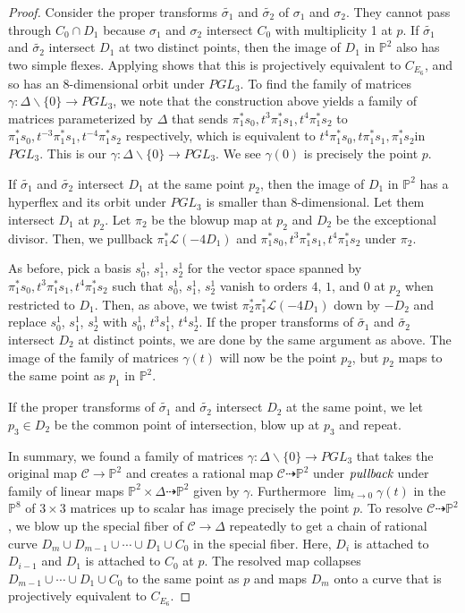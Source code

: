 \documentclass{article}
\theoremstyle{definition}
\newcommand{\mb}{\mathbb}
\newcommand{\mc}{\mathcal}
\newcommand{\wt}{\widetilde}
\begin{document}
\begin{proof}
Consider the proper transforms $\wt{\sigma_1}$ and $\wt{\sigma_2}$ of $\sigma_1$ and $\sigma_2$. They cannot pass through $C_0\cap D_1$ because $\sigma_1$ and $\sigma_2$ intersect $C_0$ with multiplicity 1 at $p$. If $\wt{\sigma_1}$ and $\wt{\sigma_2}$ intersect $D_1$ at two distinct points, then the image of $D_1$ in $\mb{P}^2$ also has two simple flexes. Applying  shows that this is projectively equivalent to $C_{E_6}$, and so has an 8-dimensional orbit under $PGL_3$. To find the family of matrices $\gamma: \Delta\backslash\{0\}\to PGL_3$, we note that the construction above yields a family of matrices parameterized by $\Delta$ that sends $\pi_1^{*}s_0, t^3\pi_1^{*}s_1, t^4\pi_1^{*}s_2$ to $\pi_1^{*}s_0, t^{-3}\pi_1^{*}s_1, t^{-4}\pi_1^{*}s_2$ respectively, which is equivalent to $t^4\pi_1^{*}s_0, t\pi_1^{*}s_1, \pi_1^{*}s_2$in $PGL_3$. This is our $\gamma: \Delta\backslash\{0\}\to PGL_3$. We see $\gamma(0)$ is precisely the point $p$. 

If $\wt{\sigma_1}$ and $\wt{\sigma_2}$ intersect $D_1$ at the same point $p_2$, then the image of $D_1$ in $\mb{P}^2$ has a hyperflex and its orbit under $PGL_3$ is smaller than 8-dimensional. Let them intersect $D_1$ at $p_2$. Let $\pi_2$ be the blowup map at $p_2$ and $D_2$ be the exceptional divisor. Then, we pullback $\pi_1^{*}\mc{L}(-4D_1)$ and $\pi_1^{*}s_0, t^3\pi_1^{*}s_1, t^4\pi_1^{*}s_2$ under $\pi_2$. 

As before, pick a basis $s_0^1$, $s_1^1$, $s_2^1$ for the vector space spanned by $\pi_1^{*}s_0, t^3\pi_1^{*}s_1, t^4\pi_1^{*}s_2$ such that $s_0^1$, $s_1^1$, $s_2^1$ vanish to orders $4$, $1$, and $0$ at $p_2$ when restricted to $D_1$. Then, as above, we twist $\pi_2^{*}\pi_1^{*}\mc{L}(-4D_1)$ down by $-D_2$ and replace $s_0^1$, $s_1^1$, $s_2^1$ with $s_0^1$, $t^3s_1^1$, $t^4s_2^1$. If the proper transforms of $\wt{\sigma_1}$ and $\wt{\sigma_2}$ intersect $D_2$ at distinct points, we are done by the same argument as above. The image of the family of matrices $\gamma(t)$ will now be the point $p_2$, but $p_2$ maps to the same point as $p_1$ in $\mb{P}^2$. 

If the proper transforms of $\wt{\sigma_1}$ and $\wt{\sigma_2}$ intersect $D_2$ at the same point, we let $p_3\in D_2$ be the common point of intersection, blow up at $p_3$ and repeat. 

In summary, we found a family of matrices $\gamma: \Delta\backslash\{0\}\to PGL_3$ that takes the original map $\mc{C}\to \mb{P}^2$ and creates a rational map $\mc{C}\dashrightarrow \mb{P}^2$ under $\emph{pullback}$ under family of linear maps $\mb{P}^2\times \Delta \dashrightarrow \mb{P}^2$ given by $\gamma$. Furthermore $\lim_{t\to 0}{\gamma(t)}$ in the $\mb{P}^8$ of $3\times 3$ matrices up to scalar has image precisely the point $p$. To resolve $\mc{C}\dashrightarrow \mb{P}^2$ , we blow up the special fiber of $\mc{C}\to \Delta$ repeatedly to get a chain of rational curve $D_m\cup D_{m-1}\cup\cdots\cup D_1\cup C_0$ in the special fiber. Here, $D_{i}$ is attached to $D_{i-1}$ and $D_1$ is attached to $C_0$ at $p$. The resolved map collapses $D_{m-1}\cup\cdots\cup D_1\cup C_0$ to the same point as $p$ and maps $D_{m}$ onto a curve that is projectively equivalent to $C_{E_6}$. 
\end{proof}
\end{document}
